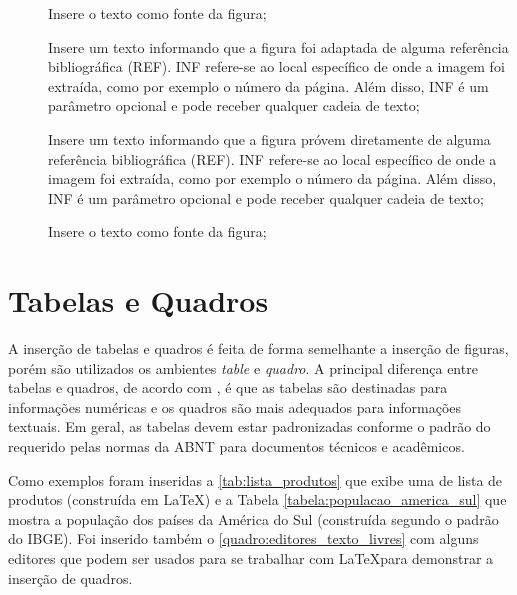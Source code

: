 \begin{description}

 \item[] Insere o texto  como fonte da figura;

 \item[] Insere um texto informando que a figura foi adaptada de alguma referência bibliográfica (REF). INF refere-se ao local específico de onde a imagem foi extraída, como por exemplo o número da página. Além disso, INF é um parâmetro opcional e pode receber qualquer cadeia de texto;

 \item[] Insere um texto informando que a figura próvem diretamente de alguma referência bibliográfica (REF). INF refere-se ao local específico de onde a imagem foi extraída, como por exemplo o número da página. Além disso, INF é um parâmetro opcional e pode receber qualquer cadeia de texto;
 
 \item[] Insere o texto  como fonte da figura;
 
\end{description}




\section{Tabelas e Quadros}
\label{secao:tabelas_e_quadros}

A inserção de tabelas e quadros é feita de forma semelhante a inserção de figuras, porém são utilizados os ambientes \textit{table} e \textit{quadro}. A principal diferença entre tabelas e quadros, de acordo com , é que as tabelas são destinadas para informações numéricas e os quadros são mais adequados para informações textuais. Em geral, as tabelas devem estar padronizadas conforme o padrão do  requerido pelas normas da ABNT para documentos técnicos e acadêmicos.

Como exemplos foram inseridas a \autoref{tab:lista_produtos} que exibe uma de lista de produtos (construída em \LaTeX) e a Tabela \autoref{tabela:populacao_america_sul} que mostra a população dos países da América do Sul (construída segundo o padrão do IBGE). Foi inserido também o \autoref{quadro:editores_texto_livres} com alguns editores que podem ser usados para se trabalhar com \LaTeX para demonstrar a inserção de quadros.

